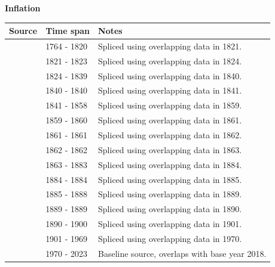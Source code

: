 \documentclass[12pt,a4paper,landscape]{article}
\begin{document}
\begin{adjustbox}{max totalsize={\paperwidth}{\paperheight},center}
\begin{minipage}[t][\textheight][t]{\textwidth}
\vspace*{0.5cm}
{}
\begin{center}
{\Large\bfseries Inflation}
\end{center}
\vspace{0.5cm}
\begin{table}[H]
\centering
\small
\begin{tabular}{|l|l|l|}
\hline
\textbf{Source} & \textbf{Time span} & \textbf{Notes} \\
\hline
\rowcolor{white}\cite{CLIO}& 1764 - 1820 &Spliced using overlapping data in 1821. \\
\rowcolor{lightgray}\cite{RR}& 1821 - 1823 &Spliced using overlapping data in 1824. \\
\rowcolor{white}\cite{CLIO}& 1824 - 1839 &Spliced using overlapping data in 1840. \\
\rowcolor{lightgray}\cite{RR}& 1840 - 1840 &Spliced using overlapping data in 1841. \\
\rowcolor{white}\cite{CLIO}& 1841 - 1858 &Spliced using overlapping data in 1859. \\
\rowcolor{lightgray}\cite{RR}& 1859 - 1860 &Spliced using overlapping data in 1861. \\
\rowcolor{white}\cite{CLIO}& 1861 - 1861 &Spliced using overlapping data in 1862. \\
\rowcolor{lightgray}\cite{RR}& 1862 - 1862 &Spliced using overlapping data in 1863. \\
\rowcolor{white}\cite{CLIO}& 1863 - 1883 &Spliced using overlapping data in 1884. \\
\rowcolor{lightgray}\cite{RR}& 1884 - 1884 &Spliced using overlapping data in 1885. \\
\rowcolor{white}\cite{CLIO}& 1885 - 1888 &Spliced using overlapping data in 1889. \\
\rowcolor{lightgray}\cite{RR}& 1889 - 1889 &Spliced using overlapping data in 1890. \\
\rowcolor{white}\cite{CLIO}& 1890 - 1900 &Spliced using overlapping data in 1901. \\
\rowcolor{lightgray}\cite{MOXLAD}& 1901 - 1969 &Spliced using overlapping data in 1970. \\
\rowcolor{white}\cite{WB_CC}& 1970 - 2023 &Baseline source, overlaps with base year 2018. \\

\end{tabular}
\end{table}
\end{minipage}
\end{adjustbox}
\end{document}
